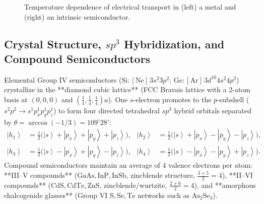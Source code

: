 \documentclass[11pt,a4paper]{article}
\newcommand{\ket}[1]{\left|#1\right\rangle}
\newcommand{\dv}[2]{\frac{\mathrm{d}#1}{\mathrm{d}#2}}
\begin{document}
\begin{figure}[htbp]
\centering
{}
\caption{Temperature dependence of electrical transport in (left) a metal and (right) an intrinsic semiconductor.}
\label{fig:rho_sigma_temp_master}
\end{figure}

\subsection{Crystal Structure, \texorpdfstring{$sp^3$}{sp3} Hybridization, and Compound Semiconductors}
Elemental Group IV semiconductors ($\text{Si}: [\text{Ne}]\,3s^2 3p^2$; $\text{Ge}: [\text{Ar}]\,3d^{10}4s^2 4p^2$) crystallize in the **diamond cubic lattice** (FCC Bravais lattice with a 2-atom basis at $(0,0,0)$ and $(\frac{1}{4},\frac{1}{4},\frac{1}{4})a$). One $s$-electron promotes to the $p$-subshell ($s^2p^2 \to s^1p_x^1p_y^1p_z^1$) to form four directed tetrahedral $sp^3$ hybrid orbitals separated by $\theta = \arccos(-1/3) = 109^\circ 28'$:
\begin{align}
    \ket{h_1} &= \frac{1}{2}\big(\ket{s}+\ket{p_x}+\ket{p_y}+\ket{p_z}\big), & \ket{h_2} &= \frac{1}{2}\big(\ket{s}+\ket{p_x}-\ket{p_y}-\ket{p_z}\big), \\
    \ket{h_3} &= \frac{1}{2}\big(\ket{s}-\ket{p_x}+\ket{p_y}-\ket{p_z}\big), & \ket{h_4} &= \frac{1}{2}\big(\ket{s}-\ket{p_x}-\ket{p_y}+\ket{p_z}\big).
\end{align}
Compound semiconductors maintain an average of $4$ valence electrons per atom: **III--V compounds** ($\text{GaAs}, \text{InP}, \text{InSb}$, zincblende structure, $\frac{3+5}{2}=4$), **II--VI compounds** ($\text{CdS}, \text{CdTe}, \text{ZnS}$, zincblende/wurtzite, $\frac{2+6}{2}=4$), and **amorphous chalcogenide glasses** (Group VI $\text{S}, \text{Se}, \text{Te}$ networks such as $\text{As}_2\text{Se}_3$).
\end{document}
